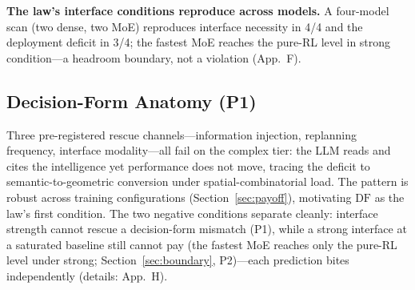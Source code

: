\documentclass[sigconf,anonymous]{aamas}
\newcommand{\sapp}[1]{App.~#1}
\begin{document}
\begin{table}[t]
\centering
\caption{Six-arm accounting batch (medium tier, 10 paired seeds): mean composites and per-seed successes, with deployment accounting identities (seed-bootstrap 95\% CIs). $V_m$ = per-seed max of pure baselines (rule+rule overall mean 0.913; pure RL overall mean 0.883).}
\label{tab:sixarm}
\end{table}

\textbf{The law's interface conditions reproduce across models.}
A four-model scan (two dense, two MoE) reproduces interface necessity in 4/4 and the deployment deficit in 3/4; the fastest MoE reaches the pure-RL level in strong condition---a headroom boundary, not a violation (\sapp{F}).

\subsection{Decision-Form Anatomy (P1)}\label{sec:intervention}

Three pre-registered rescue channels---information injection, replanning frequency, interface modality---all fail on the complex tier: the LLM reads and cites the intelligence yet performance does not move, tracing the deficit to semantic-to-geometric conversion under spatial-combinatorial load. The pattern is robust across training configurations (Section~\ref{sec:payoff}), motivating $\mathrm{DF}$ as the law's first condition. The two negative conditions separate cleanly: interface strength cannot rescue a decision-form mismatch (P1), while a strong interface at a saturated baseline still cannot pay (the fastest MoE reaches only the pure-RL level under strong; Section~\ref{sec:boundary}, P2)---each prediction bites independently (details: \sapp{H}).
\end{document}
